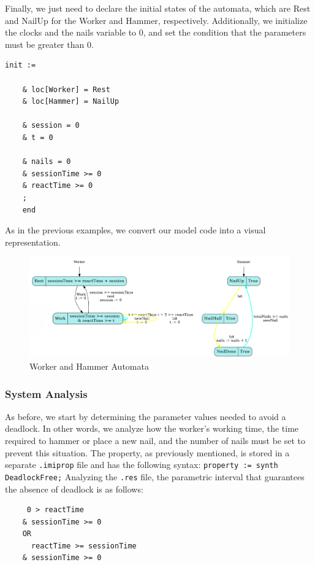 Finally, we just need to declare the initial states of the automata, which are Rest and NailUp for the Worker and Hammer, respectively. Additionally, we initialize the clocks and the nails variable to 0, and set the condition that the parameters must be greater than 0.

\begin{lstlisting}[language=UPPAAL]
    init := 
  
    & loc[Worker] = Rest
    & loc[Hammer] = NailUp
    
    & session = 0
    & t = 0
    
    & nails = 0
    & sessionTime >= 0
    & reactTime >= 0
    ;
    end
\end{lstlisting}


As in the previous examples, we convert our model code into a visual representation.

\begin{figure} [H]
    \centering
    \includegraphics[width=1\linewidth]{images/WH-PTA.png}
    \caption[Worker and Hammer Automata]{Worker and Hammer Automata}
    \label{fig:cof_output}
\end{figure}




\subsubsection{System Analysis}

As before, we start by determining the parameter values needed to avoid a deadlock. In other words, we analyze how the worker's working time, the time required to hammer or place a new nail, and the number of nails must be set to prevent this situation. The property, as previously mentioned, is stored in a separate \texttt{.imiprop} file and has the following syntax: \texttt{property := synth DeadlockFree;} Analyzing the \texttt{.res} file, the parametric interval that guarantees the absence of deadlock is as follows:

\begin{verbatim}
     0 > reactTime
    & sessionTime >= 0
    OR
      reactTime >= sessionTime
    & sessionTime >= 0
\end{verbatim}

